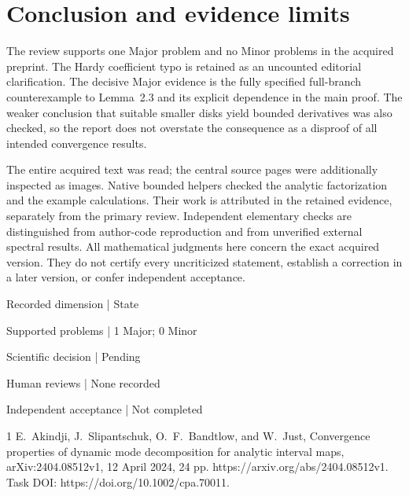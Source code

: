 \documentclass[10pt]{article}
\begin{document}
\section*{Conclusion and evidence limits}
The review supports one Major problem and no Minor problems in the acquired preprint. The Hardy coefficient typo is retained as an uncounted editorial clarification. The decisive Major evidence is the fully specified full-branch counterexample to Lemma 2.3 and its explicit dependence in the main proof. The weaker conclusion that suitable smaller disks yield bounded derivatives was also checked, so the report does not overstate the consequence as a disproof of all intended convergence results.\par
The entire acquired text was read; the central source pages were additionally inspected as images. Native bounded helpers checked the analytic factorization and the example calculations. Their work is attributed in the retained evidence, separately from the primary review. Independent elementary checks are distinguished from author-code reproduction and from unverified external spectral results. All mathematical judgments here concern the exact acquired version. They do not certify every uncriticized statement, establish a correction in a later version, or confer independent acceptance.\par
Recorded dimension | State\par
Supported problems | 1 Major; 0 Minor\par
Scientific decision | Pending\par
Human reviews | None recorded\par
Independent acceptance | Not completed\par
1 E. Akindji, J. Slipantschuk, O. F. Bandtlow, and W. Just, Convergence properties of dynamic mode decomposition for analytic interval maps, arXiv:2404.08512v1, 12 April 2024, 24 pp. https://arxiv.org/abs/2404.08512v1. Task DOI: https://doi.org/10.1002/cpa.70011.\par
\end{document}
